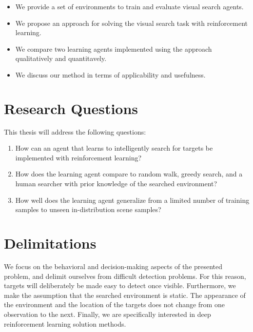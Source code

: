 \begin{itemize}
  \item We provide a set of environments to train and evaluate visual search agents.
  \item We propose an approach for solving the visual search task with reinforcement learning.
  \item We compare two learning agents implemented using the approach qualitatively and quantitavely.
  \item We discuss our method in terms of applicability and usefulness.
\end{itemize}

\section{Research Questions}
\label{sec:questions}

This thesis will address the following questions:

\begin{enumerate}
  \item \label{itm:rq1} How can an agent that learns to intelligently search for targets be implemented with reinforcement learning?
  \item \label{itm:rq2} How does the learning agent compare to random walk, greedy search, and a human searcher with prior knowledge of the searched environment?
  \item \label{itm:rq3} How well does the learning agent generalize from a limited number of training samples to unseen in-distribution scene samples?
\end{enumerate}

\section{Delimitations}
\label{sec:delimitations}

We focus on the behavioral and decision-making aspects of the presented problem, and delimit ourselves from difficult detection problems.
For this reason, targets will deliberately be made easy to detect once visible.
Furthermore, we make the assumption that the searched environment is static.
The appearance of the environment and the location of the targets does not change from one observation to the next.
Finally, we are specifically interested in deep reinforcement learning solution methods.
